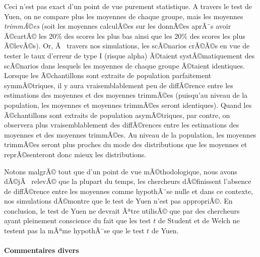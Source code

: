 \begin{appendix}
Ceci n'est pas exact d'un point de vue purement statistique. A travers
le test de Yuen, on ne compare plus les moyennes de chaque groupe, mais
les moyennes \emph{trimmÃ©es} (soit les moyennes calculÃ©es sur les
donnÃ©es aprÃ¨s avoir Ã©cartÃ© les 20\% des scores les plus bas ainsi
que les 20\% des scores les plus Ã©levÃ©s). Or, Ã~ travers nos
simulations, les scÃ©narios crÃ©Ã©s en vue de tester le taux d'erreur de
type I (risque alpha) Ã©taient systÃ©matiquement des scÃ©narios dans
lesquels les moyennes de chaque groupe Ã©taient identiques. Lorsque les
Ã©chantillons sont extraits de population parfaitement symmÃ©triques, il
y aura vraisemblablement peu de diffÃ©rence entre les estimations des
moyennes et des moyennes trimmÃ©es (puisqu'au niveau de la population,
les moyennes et moyennes trimmÃ©es seront identiques). Quand les
Ã©chantillons sont extraits de population asymÃ©triques, par contre, on
observera plus vraisemblablement des diffÃ©rences entre les estimations
des moyennes et des moyennes trimmÃ©es. Au niveau de la population, les
moyennes trimmÃ©es seront plus proches du mode des distributions que les
moyennes et reprÃ©senteront donc mieux les distributions.

Notons malgrÃ© tout que d'un point de vue mÃ©thodologique, nous avons
dÃ©jÃ~ relevÃ© que la plupart du temps, les chercheurs dÃ©finissent
l'absence de diffÃ©rence entre les moyennes comme hypothÃ¨se nulle et
dans ce contexte, nos simulations dÃ©montre que le test de Yuen n'est
pas appropriÃ©. En conclusion, le test de Yuen ne devrait Ãªtre utilisÃ©
que par des chercheurs ayant pleinement conscience du fait que les test
\(t\) de Student et de Welch ne testent pas la mÃªme hypothÃ¨se que le
test \(t\) de Yuen.

\hypertarget{commentaires-divers}{%
\paragraph{Commentaires divers}\label{commentaires-divers}}


\end{appendix}
